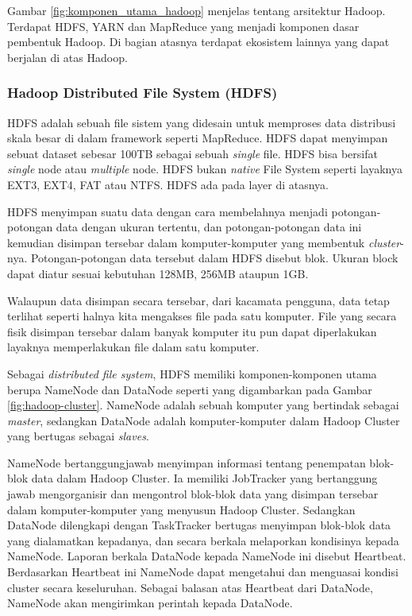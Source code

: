 Gambar \ref{fig:komponen_utama_hadoop} menjelas tentang arsitektur Hadoop. Terdapat HDFS, YARN dan MapReduce yang menjadi komponen dasar pembentuk Hadoop. Di bagian atasnya terdapat ekosistem lainnya yang dapat berjalan di atas Hadoop.

\subsubsection{Hadoop Distributed File System (HDFS)}
HDFS adalah sebuah file sistem yang didesain untuk memproses data distribusi skala besar di dalam framework seperti MapReduce. HDFS dapat menyimpan sebuat dataset sebesar 100TB sebagai sebuah \textit{single} file.\cite{Lam:2010:HA:1965594} HDFS bisa bersifat \textit{single} node atau \textit{multiple} node. HDFS bukan \textit{native} File System seperti layaknya EXT3, EXT4, FAT atau NTFS. HDFS ada pada layer di atasnya.

HDFS menyimpan suatu data dengan cara membelahnya menjadi potongan-potongan data dengan ukuran tertentu, dan potongan-potongan data ini kemudian disimpan tersebar dalam komputer-komputer yang membentuk \textit{cluster}-nya. Potongan-potongan data tersebut dalam HDFS disebut blok. Ukuran block dapat diatur sesuai kebutuhan 128MB, 256MB ataupun 1GB.

Walaupun data disimpan secara tersebar, dari kacamata pengguna, data tetap terlihat seperti halnya kita mengakses file pada satu komputer. File yang secara fisik disimpan tersebar dalam banyak komputer itu pun dapat diperlakukan layaknya memperlakukan file dalam satu komputer.

Sebagai \textit{distributed file system}, HDFS memiliki komponen-komponen utama berupa NameNode dan DataNode seperti yang digambarkan pada Gambar \ref{fig:hadoop-cluster}. NameNode adalah sebuah komputer yang bertindak sebagai \textit{master}, sedangkan DataNode adalah komputer-komputer dalam Hadoop Cluster yang bertugas sebagai \textit{slaves}. 

NameNode bertanggungjawab menyimpan informasi tentang penempatan blok-blok data dalam Hadoop Cluster. Ia memiliki JobTracker yang bertanggung jawab mengorganisir dan mengontrol blok-blok data yang disimpan tersebar dalam komputer-komputer yang menyusun Hadoop Cluster. Sedangkan DataNode dilengkapi dengan TaskTracker bertugas menyimpan blok-blok data yang dialamatkan kepadanya, dan secara berkala melaporkan kondisinya kepada NameNode. Laporan berkala DataNode kepada NameNode ini disebut Heartbeat. Berdasarkan Heartbeat ini NameNode dapat mengetahui dan menguasai kondisi cluster secara keseluruhan. Sebagai balasan atas Heartbeat dari DataNode, NameNode akan mengirimkan perintah kepada DataNode. 

